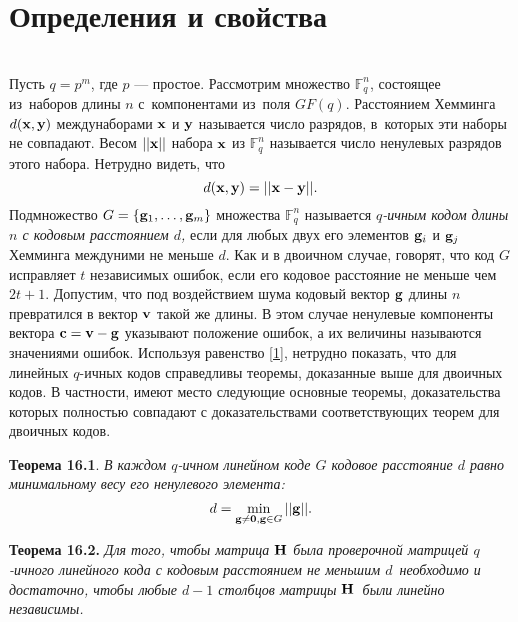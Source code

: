 \documentclass[12pt]{article}
\begin{document}
    \tableofcontents %
    \newpage
    \section{Определения и свойства}\\
    Пусть $q = p^m$, где $p$ --- простое. Рассмотрим множество $\mathbb{F}^n_q$, состоящее из~наборов 
    длины $n$ с~компонентами из~поля $GF(q)$. Расстоянием Хемминга
    $d({\bf x},{\bf y})$ междунаборами ${\bf x}$ и ${\bf y}$ называется число разрядов, в~которых эти
    наборы не совпадают. Весом $||{\bf x}||$ набора ${\bf x}$ из $\mathbb{F}^n_q$ называется число ненулевых разрядов этого набора. Нетрудно видеть, что
    \begin{equation}
        d({\bf x},{\bf y})=||{\bf x}-{\bf y}||.
        \label{1}
    \end{equation}
    Подмножество $G = \{{\bf g}_1,\dots, {\bf g}_m\}$ множества $\mathbb{F}^n_q$ называется {\it$q$-ичным кодом
    длины $n$ с кодовым расстоянием $d$,} если для любых двух его элементов ${\bf g}_i$ и ${\bf g}_j$ { Хемминга междуними не меньше $d$.} Как и в двоичном случае, говорят, что код $G$ исправляет $t$ независимых ошибок, если его кодовое расстояние не меньше чем $2t+1$. Допустим, что под воздействием шума
    кодовый вектор ${\bf g}$ длины $n$ превратился в вектор ${\bf v}$ такой же длины. В этом случае ненулевые компоненты вектора ${\bf c=v-g}$ указывают положение ошибок, а их величины называются значениями ошибок. Используя равенство \eqref{1}, нетрудно показать, что для линейных $q$-ичных кодов справедливы теоремы, доказанные выше для двоичных кодов. В частности, имеют место следующие основные теоремы, доказательства которых полностью совпадают с доказательствами соответствующих теорем для двоичных кодов.
    
    {\bf Теорема 16.1}. {\it В каждом $q$-ичном линейном коде $G$ кодовое расстояние $d$ равно минимальному весу его ненулевого элемента:}
    \begin{equation*}
        d=\min_{{\bf g\not=0,g}\in G}||{\bf g}||.
    \end{equation*}
    
    {\bf Теорема 16.2.} {\it Для того, чтобы матрица ${\bf H}$ была проверочной матрицей 
    $q$-ичного линейного кода с кодовым расстоянием не меньшим $d$~необходимо и достаточно, чтобы любые $d-1$ столбцов матрицы ${\bf H}$~были линейно
    независимы.}
    
\end{document}

